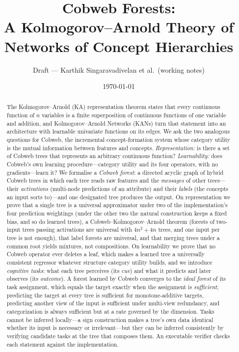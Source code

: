 \documentclass[11pt]{article}
\title{Cobweb Forests:\\ A Kolmogorov--Arnold Theory of Networks of Concept Hierarchies}
\author{Draft --- Karthik Singaravadivelan et al.\ (working notes)}
\date{\today}
\theoremstyle{definition}
\theoremstyle{remark}
\begin{document}
\maketitle

\begin{abstract}
The Kolmogorov--Arnold (KA) representation theorem states that every continuous
function of $n$ variables is a finite superposition of continuous functions of one
variable and addition, and Kolmogorov--Arnold Networks (KANs) turn that statement into
an architecture with learnable univariate functions on its edges.  We ask the two
analogous questions for Cobweb, the incremental concept-formation system whose
category utility is the mutual information between features and concepts.
\emph{Representation:} is there a set of Cobweb trees that represents an arbitrary
continuous function?  \emph{Learnability:} does Cobweb's own learning
procedure---category utility and its four operators, with no gradients---learn it?
We formalise a \emph{Cobweb forest}: a directed acyclic graph of hybrid Cobweb trees in
which each tree reads raw features and the \emph{messages} of other trees---their
\emph{activations} (multi-node predictions of an attribute) and their \emph{labels}
(the concepts an input sorts to)---and one designated tree produces the output.
On representation we prove that a single tree is a universal approximator under two of
the implementation's four prediction weightings (under the other two the natural
construction keeps a fixed bias, and so do learned trees), a
Cobweb--Kolmogorov--Arnold theorem (forests of two-input trees passing activations are
universal with $4n^2+4n$ trees, and one input per tree is not enough), that label forests
are universal, and that merging trees under a common root yields mixtures, not
compositions.  On learnability we prove that no Cobweb operator ever deletes a leaf,
which makes a learned tree a universally consistent regressor whatever structure
category utility builds, and we introduce \emph{cognitive tasks}: what each tree
perceives (its \emph{cue}) and what it predicts and later observes (its
\emph{outcome}).  A forest learned by Cobweb converges to the \emph{ideal forest} of its
task assignment, which equals the target exactly when the assignment is
\emph{sufficient}; predicting the target at every tree is sufficient for
monotone-additive targets, predicting another view of the input is sufficient under
multi-view redundancy, and categorization is always sufficient but at a rate governed by
the dimension.  Tasks cannot be inferred locally---a sign construction makes a tree's
own data identical whether its input is necessary or irrelevant---but they can be
inferred consistently by verifying candidate tasks at the tree that composes them.  An
executable verifier checks each statement against the implementation.
\end{abstract}
\end{document}
